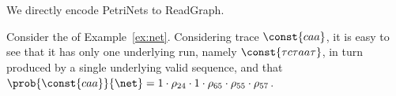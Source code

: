 We directly encode \textsf{PetriNet}s to \textsf{ReadGraph}.
\begin{example} %
	 \label{ex:trace}
Consider the \uswn \net of Example~\ref{ex:net}. Considering trace $\const{caa}$, it is easy to see that it has only one underlying run, namely $\const{\tau c \tau a a \tau}$, in turn produced by a single underlying valid sequence, and that
$\prob{\const{caa}}{\net} = 1 \cdot \rho_{24} \cdot 1 \cdot \rho_{65} \cdot \rho_{55} \cdot \rho_{57}$.
\end{example}



